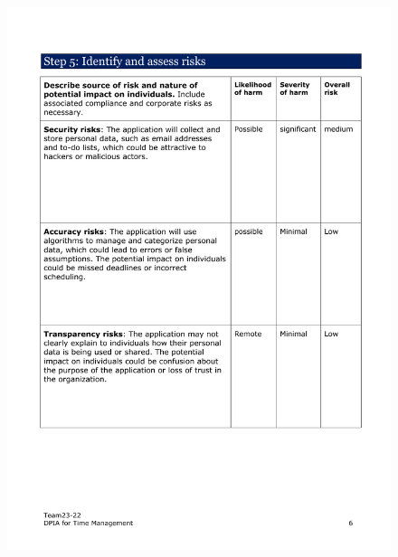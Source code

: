 \documentclass[a4paper]{article}
\begin{document}
\begin{figure}[H]
	\centering
	\includegraphics[width=1\textwidth]{./images/DPIA-Team23-22/DPIA-Team23-22_6.pdf}
	\label{Fig.DPIA_6}
\end{figure}
\end{document}
